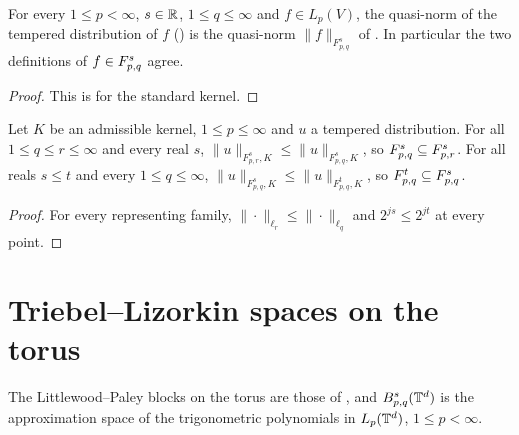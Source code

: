 \begin{theorem}
\label{thm:tl-distr-lp}
\leanok
{}
For every $1 \leq p < \infty$, $s \in \mathbb{R}$, $1 \leq q \leq \infty$ and $f \in L_p(V)$, the
quasi-norm of the tempered distribution of $f$ () is the quasi-norm
$\|f\|_{F^s_{p,q}}$ of . In particular the two definitions of
$f \in F^{s}_{p,q}$ agree.
\end{theorem}

\begin{proof}
\leanok
This is  for the standard kernel.
\end{proof}

\begin{proposition}
\label{prop:tl-distr-mono}
\leanok
{}
Let $K$ be an admissible kernel, $1 \leq p \leq \infty$ and $u$ a tempered distribution. For all
$1 \leq q \leq r \leq \infty$ and every real $s$, $\|u\|_{F^s_{p,r}, K} \leq \|u\|_{F^s_{p,q}, K}$,
so $F^{s}_{p,q} \subseteq F^{s}_{p,r}$. For all reals $s \leq t$ and every
$1 \leq q \leq \infty$, $\|u\|_{F^s_{p,q}, K} \leq \|u\|_{F^t_{p,q}, K}$, so
$F^{t}_{p,q} \subseteq F^{s}_{p,q}$.
\end{proposition}

\begin{proof}
\leanok
For every representing family, $\|\cdot\|_{\ell_r} \leq \|\cdot\|_{\ell_q}$ and
$2^{js} \leq 2^{jt}$ at every point.
\end{proof}

\section{Triebel--Lizorkin spaces on the torus}
\label{sec:torus-triebel-lizorkin}

The Littlewood--Paley blocks on the torus are those of , and
$B^{s}_{p,q}(\mathbb{T}^d)$ is the approximation space of the trigonometric polynomials in
$L_p(\mathbb{T}^d)$, $1 \leq p < \infty$.

